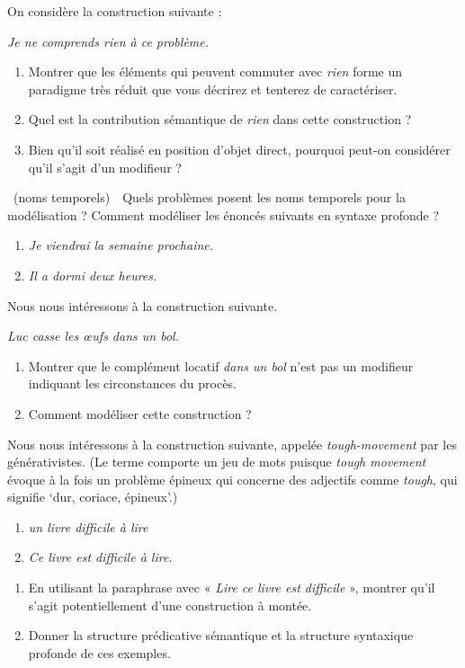{ On considère la construction suivante :
\begin{exe}
    \exi{} \textit{Je ne comprends rien à ce problème.}
\end{exe}

\begin{enumerate}
\item Montrer que les éléments qui peuvent commuter avec \textit{rien} forme un paradigme très réduit que vous décrirez et tenterez de caractériser.
\item Quel est la contribution sémantique de \textit{rien} dans cette construction ?
\item Bien qu’il soit réalisé en position d’objet direct, pourquoi peut-on considérer qu’il s’agit d’un modifieur ?
\end{enumerate}

~(noms temporels)\ \ Quels problèmes posent les noms temporels pour la modélisation ? Comment modéliser les énoncés suivants en syntaxe profonde ?
\begin{enumerate}[label=\alph*.]
\item\textit{Je viendrai la semaine prochaine.}
\item\textit{Il a dormi deux heures.}
\end{enumerate}

 Nous nous intéressons à la construction suivante.
\begin{exe}
\exi{}\textit{Luc casse les œufs dans un bol.}
\end{exe}
\begin{enumerate}
\item Montrer que le complément locatif \textit{dans un bol} n’est pas un modifieur indiquant les circonstances du procès.
\item Comment modéliser cette construction ?
\end{enumerate}

 Nous nous intéressons à la construction suivante, appelée \textit{tough-movement} par les générativistes. (Le terme comporte un jeu de mots puisque \textit{tough movement} évoque à la fois un problème épineux qui concerne des adjectifs comme \textit{tough}, qui signifie ‘dur, coriace, épineux’.)
\begin{enumerate}[label=\alph*.]
\item \textit{un livre difficile à lire}
\item\textit{Ce livre est difficile à lire.}
\end{enumerate}
\begin{enumerate}
\item En utilisant la paraphrase avec « \textit{Lire ce livre est difficile} », montrer qu’il s’agit potentiellement d’une construction à montée.
\item Donner la structure prédicative sémantique et la structure syntaxique profonde de ces exemples.
\end{enumerate}

}
